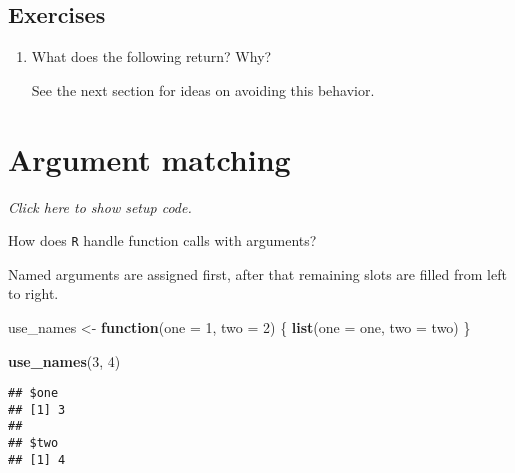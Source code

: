 \documentclass[]{book}
\newenvironment{Shaded}{\begin{snugshade}}{\end{snugshade}}
\newcommand{\ControlFlowTok}[1]{\textcolor[rgb]{0.13,0.29,0.53}{\textbf{#1}}}
\newcommand{\DataTypeTok}[1]{\textcolor[rgb]{0.13,0.29,0.53}{#1}}
\newcommand{\DecValTok}[1]{\textcolor[rgb]{0.00,0.00,0.81}{#1}}
\newcommand{\KeywordTok}[1]{\textcolor[rgb]{0.13,0.29,0.53}{\textbf{#1}}}
\newcommand{\NormalTok}[1]{#1}
\newcommand{\OperatorTok}[1]{\textcolor[rgb]{0.81,0.36,0.00}{\textbf{#1}}}
\newcommand{\OtherTok}[1]{\textcolor[rgb]{0.56,0.35,0.01}{#1}}
\newcommand{\StringTok}[1]{\textcolor[rgb]{0.31,0.60,0.02}{#1}}
\begin{document}
\hypertarget{exercises-4}{%
\subsection{Exercises}\label{exercises-4}}

\begin{enumerate}
\def\labelenumi{\arabic{enumi}.}
\item
  What does the following return? Why?

\begin{Shaded}
\end{Shaded}

  See the next section for ideas on avoiding this behavior.
\end{enumerate}

\hypertarget{argument-matching}{%
\section{Argument matching}\label{argument-matching}}

\emph{Click here to show setup code.}

How does \texttt{R} handle function calls with arguments?

Named arguments are assigned first, after that remaining slots are filled from left to right.

\begin{Shaded}
\begin{Highlighting}[]
\NormalTok{use_names <-}\StringTok{ }\ControlFlowTok{function}\NormalTok{(}\DataTypeTok{one =} \DecValTok{1}\NormalTok{, }\DataTypeTok{two =} \DecValTok{2}\NormalTok{) \{}
  \KeywordTok{list}\NormalTok{(}\DataTypeTok{one =}\NormalTok{ one, }\DataTypeTok{two =}\NormalTok{ two)}
\NormalTok{\}}

\KeywordTok{use_names}\NormalTok{(}\DecValTok{3}\NormalTok{, }\DecValTok{4}\NormalTok{)}
\end{Highlighting}
\end{Shaded}

\begin{verbatim}
## $one
## [1] 3
## 
## $two
## [1] 4
\end{verbatim}
\end{document}
